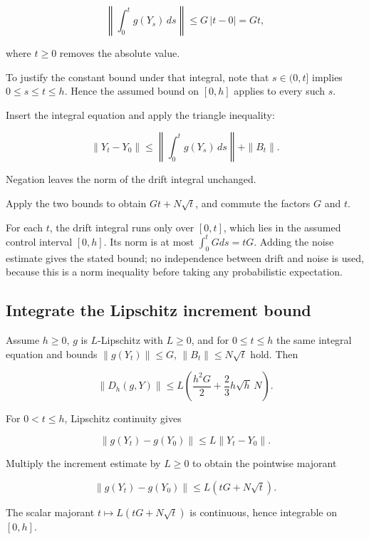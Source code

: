 \documentclass[11pt,a4paper]{report}
\begin{document}
\[\left\|\int_0^t g(Y_s)\,ds\right\|\le G\,|t-0|=Gt,\]

where \(t\ge0\) removes the absolute value.



To justify the constant bound under that integral, note that \(s\in(0,t]\) implies \(0\le s\le t\le h\). Hence the assumed bound on \([0,h]\) applies to every such \(s\).



Insert the integral equation and apply the triangle inequality:

\[\|Y_t-Y_0\|\le\left\|\int_0^t g(Y_s)\,ds\right\|+\|B_t\|.\]

Negation leaves the norm of the drift integral unchanged.



Apply the two bounds to obtain \(Gt+N\sqrt t\), and commute the factors \(G\) and \(t\).



For each \(t\), the drift integral runs only over \([0,t]\), which lies in the assumed control interval \([0,h]\). Its norm is at most \(\int_0^tGds=tG\). Adding the noise estimate gives the stated bound; no independence between drift and noise is used, because this is a norm inequality before taking any probabilistic expectation.

\subsection{\texorpdfstring{Integrate the Lipschitz increment bound}{Integrate the Lipschitz increment bound}}
\label{report-step-UnadjustedLangevin-LocalError-lean-7}


Assume \(h\ge0\), \(g\) is \(L\)-Lipschitz with \(L\ge0\), and for \(0\le t\le h\) the same integral equation and bounds \(\|g(Y_t)\|\le G\), \(\|B_t\|\le N\sqrt t\) hold. Then

\[\|D_h(g,Y)\|\le L\left(\frac{h^2G}{2}+\frac23h\sqrt h\,N\right).\]

For \(0<t\le h\), Lipschitz continuity gives

\[\|g(Y_t)-g(Y_0)\|\le L\|Y_t-Y_0\|.\]

Multiply the increment estimate by \(L\ge0\) to obtain the pointwise majorant

\[\|g(Y_t)-g(Y_0)\|\le L(tG+N\sqrt t).\]

The scalar majorant \(t\mapsto L(tG+N\sqrt t)\) is continuous, hence integrable on \([0,h]\).
\end{document}
